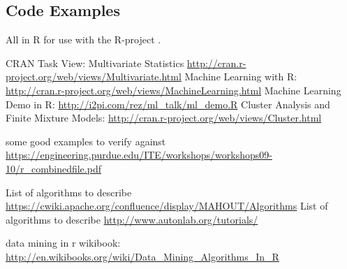 \begin{bibunit}
\section{Code Examples}

All in R for use with the R-project \cite{RDevelopmentCoreTeam2011}.

CRAN Task View: Multivariate Statistics \url{http://cran.r-project.org/web/views/Multivariate.html}
Machine Learning with R: \url{http://cran.r-project.org/web/views/MachineLearning.html}
Machine Learning Demo in R: \url{http://i2pi.com/rez/ml_talk/ml_demo.R}
Cluster Analysis and Finite Mixture Models: \url{http://cran.r-project.org/web/views/Cluster.html}

some good examples to verify against \url{https://engineering.purdue.edu/ITE/workshops/workshops09-10/r_combinedfile.pdf}

List of algorithms to describe \url{https://cwiki.apache.org/confluence/display/MAHOUT/Algorithms}
List of algorithms to describe \url{http://www.autonlab.org/tutorials/}


data mining in r wikibook: \url{http://en.wikibooks.org/wiki/Data_Mining_Algorithms_In_R}

\renewcommand{\bibsection}{\section{\bibname}}
\putbib
\end{bibunit}
